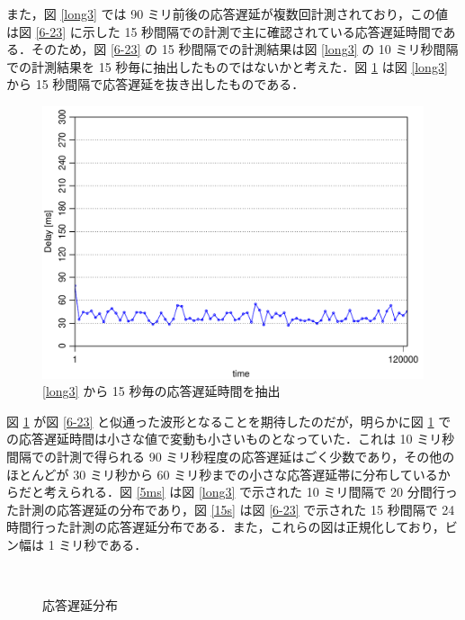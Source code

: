 \documentclass[a4j]{jarticle}
\begin{document}
また，図 \ref{long3} では 90 ミリ前後の応答遅延が複数回計測されており，この値は図 \ref{6-23} に示した 15 秒間隔での計測で主に確認されている応答遅延時間である．そのため，図 \ref{6-23} の 15 秒間隔での計測結果は図 \ref{long3} の 10 ミリ秒間隔での計測結果を 15 秒毎に抽出したものではないかと考えた．図 \ref{ext} は図 \ref{long3} から 15 秒間隔で応答遅延を抜き出したものである．
\begin{figure}
\centering
\includegraphics[width=0.8\hsize]{../2020-07-20/ext.pdf}
\caption{\ref{long3} から 15 秒毎の応答遅延時間を抽出}
\label{ext}
\end{figure}
図 \ref{ext} が図 \ref{6-23} と似通った波形となることを期待したのだが，明らかに図 \ref{ext} での応答遅延時間は小さな値で変動も小さいものとなっていた．これは 10 ミリ秒間隔での計測で得られる 90 ミリ秒程度の応答遅延はごく少数であり，その他のほとんどが 30 ミリ秒から 60 ミリ秒までの小さな応答遅延帯に分布しているからだと考えられる．図 \ref{5ms} は図 \ref{long3} で示された 10 ミリ間隔で 20 分間行った計測の応答遅延の分布であり，図 \ref{15s} は図 \ref{6-23} で示された 15 秒間隔で 24 時間行った計測の応答遅延分布である．また，これらの図は正規化しており，ビン幅は 1 ミリ秒である．
\begin{figure}[tb]
\begin{center}
~
\caption{応答遅延分布}
\end{center}
\end{figure}
\end{document}
